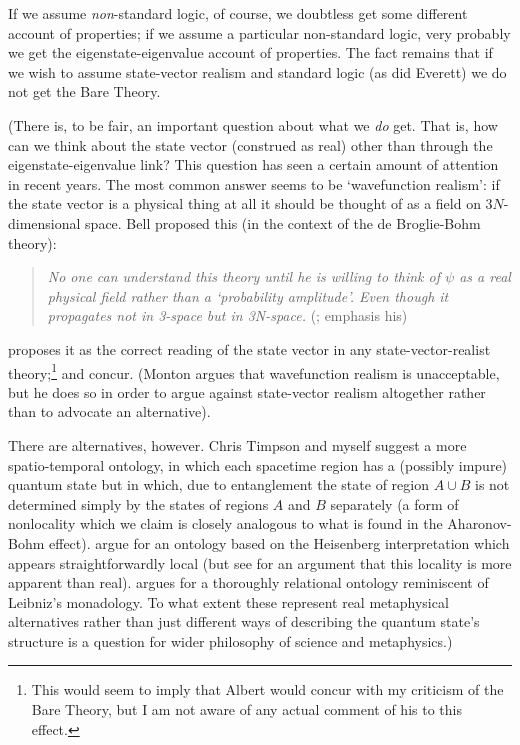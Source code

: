 \documentclass[12pt]{article}
\begin{document}
If we assume \emph{non}-standard logic, of course, we doubtless get some different account of properties; if we assume a particular non-standard logic, very probably we get the eigenstate-eigenvalue account of properties. The fact remains that if we wish to assume state-vector realism and standard logic (as did Everett) we do not get the Bare Theory. 

(There is, to be fair, an important question about what we \emph{do} get. That is, how can we think about the state vector (construed as real) other than through the eigenstate-eigenvalue link? This question has seen a certain amount of attention in recent years. The most common answer seems to be `wavefunction realism': if the state vector is a physical thing at all it should be thought of as a field on $3N$-dimensional space. Bell proposed this (in the context of the de Broglie-Bohm theory):
\begin{quote}
\emph{No one can understand this theory until he is willing to think of $\psi$ as a real physical field rather than a `probability amplitude'. Even though it propagates not in 3-space but in 3N-space.} (; emphasis his)
\end{quote}
 proposes it as the correct reading of the state vector in any state-vector-realist theory;\footnote{This would seem to imply that Albert would concur with my criticism of the Bare Theory, but I am not aware of any actual comment of his to this effect.}  and  concur. (Monton argues that wavefunction realism is unacceptable, but he does so in order to argue against state-vector realism altogether rather than to advocate an alternative). 

There are alternatives, however. Chris Timpson and myself \citeyear{wallacetimpsonshort} suggest a more spatio-temporal ontology, in which each spacetime region has a (possibly impure) quantum state but in which, due to entanglement the state of region $A \cup B$ is not determined simply by the states of regions $A$ and $B$ separately (a form of nonlocality which we claim is closely analogous to what is found in the Aharonov-Bohm effect).  argue for an ontology based on the Heisenberg interpretation which appears straightforwardly local (but see  for an argument that this locality is more apparent than real).  argues for a thoroughly relational ontology reminiscent of Leibniz's monadology. To what extent these represent real metaphysical alternatives rather than just different ways of describing the quantum state's structure is a question for wider philosophy of science and metaphysics.)
\end{document}

